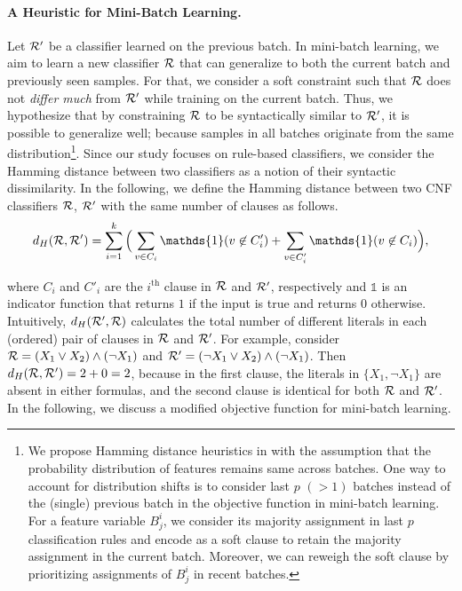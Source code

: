 \paragraph{A Heuristic for Mini-Batch Learning.} Let $ {\mathcal{R}}' $ be a classifier learned on the previous batch. In mini-batch learning, we aim to learn a new classifier $ {\mathcal{R}} $ that can generalize to both the current batch and previously seen samples. For that, we consider a soft constraint such that $ {\mathcal{R}} $ does not \emph{differ much} from $ {\mathcal{R}}' $ while training on the current batch. Thus, we hypothesize that by constraining $ {\mathcal{R}} $ to be syntactically similar to $ {\mathcal{R}}' $, it is possible to generalize well; because samples in all batches originate from the same distribution\footnote{We propose Hamming distance heuristics in {\imli} with the assumption that the probability distribution of features remains same across batches. One way to account for distribution shifts is to consider last $ p $  $ (> 1) $ batches instead of the (single) previous batch in the objective function in mini-batch learning. For a feature variable $ B^i_j $, we consider its majority assignment in last $ p $ classification rules and encode as a soft clause to retain the majority assignment in the current batch. Moreover, we can reweigh the soft clause by prioritizing assignments of $ B^i_j $ in recent batches.}. Since our study focuses on rule-based classifiers, we consider the Hamming distance between two classifiers as a notion of their syntactic dissimilarity. In the following, we define the Hamming distance between two CNF classifiers $ {\mathcal{R}} $, $ {\mathcal{R}}' $ with the same number of clauses as follows.
\[
	d_{H}(\Rule, \Rule') = \sum_{i=1}^k \Big(\sum_{v\in C_i} \mathds{1}(v \not\in C'_i) +  \sum_{v\in C'_i} \mathds{1}(v \not\in C_i) \Big), 
\]
 
 where $ C_i $ and $ C'_i $ are the $ i^\text{th} $ clause in $ {\mathcal{R}} $ and $ {\mathcal{R}}' $, respectively and $ \mathds{1} $ is an indicator function that returns $ 1 $ if the input is true and returns $ 0 $ otherwise.  Intuitively, $ d_{H}({\mathcal{R}}', {\mathcal{R}}) $ calculates the total number of different literals in each (ordered) pair of clauses in $ {\mathcal{R}} $  and $ {\mathcal{R}}' $.  For example, consider $ {\mathcal{R}} = (X_1 \vee X_2) \wedge (\neg X_1) $ and $ {\mathcal{R}}' = (\neg X_1 \vee X_2) \wedge (\neg X_1) $. Then $ 	d_{H}({\mathcal{R}}, {\mathcal{R}}') = 2 + 0 = 2 $, because in the first clause, the  literals in $ \{X_1, \neg X_1\} $ are absent in either formulas, and the second clause is identical for both $ {\mathcal{R}} $ and $ {\mathcal{R}}' $. In the following, we discuss a modified objective function for mini-batch learning.



